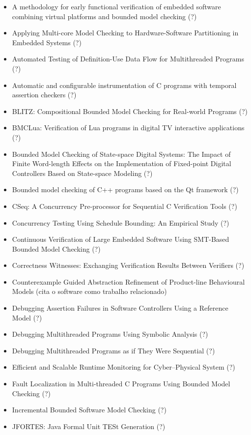 \begin{itemize}
\item A methodology for early functional verification of embedded software combining virtual platforms and bounded model checking (?)
\item Applying Multi-core Model Checking to Hardware-Software Partitioning in Embedded Systems (?)
\item Automated Testing of Definition-Use Data Flow for Multithreaded Programs (?)
\item Automatic and configurable instrumentation of C programs with temporal assertion checkers (?)
\item BLITZ: Compositional Bounded Model Checking for Real-world Programs (?)
\item BMCLua: Verification of Lua programs in digital TV interactive applications (?)
\item Bounded Model Checking of State-space Digital Systems: The Impact of Finite Word-length Effects on the Implementation of Fixed-point Digital Controllers Based on State-space Modeling (?)
\item Bounded model checking of C++ programs based on the Qt framework (?)
\item CSeq: A Concurrency Pre-processor for Sequential C Verification Tools (?)
\item Concurrency Testing Using Schedule Bounding: An Empirical Study (?)
\item Continuous Verification of Large Embedded Software Using SMT-Based Bounded Model Checking (?)
\item Correctness Witnesses: Exchanging Verification Results Between Verifiers (?)
\item Counterexample Guided Abstraction Refinement of Product-line Behavioural Models (cita o software como trabalho relacionado)
\item Debugging Assertion Failures in Software Controllers Using a Reference Model (?)
\item Debugging Multithreaded Programs Using Symbolic Analysis (?)
\item Debugging Multithreaded Programs as if They Were Sequential (?)
\item Efficient and Scalable Runtime Monitoring for Cyber--Physical System (?)
\item Fault Localization in Multi-threaded C Programs Using Bounded Model Checking (?)
\item Incremental Bounded Software Model Checking (?)
\item JFORTES: Java Formal Unit TESt Generation (?)

\end{itemize}
